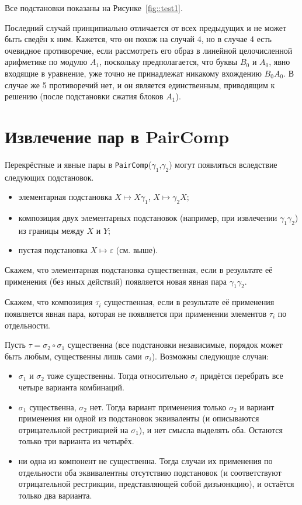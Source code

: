\documentclass[12pt]{article}
\begin{document}
Все подстановки показаны на Рисунке~\ref{fig::test1}.

Последний случай принципиально отличается от всех предыдущих и не может быть сведён к ним. Кажется, что он похож на случай 4, но в случае 4 есть очевидное противоречие, если рассмотреть его образ в линейной целочисленной арифметике по модулю $A_1$, поскольку предполагается, что буквы $B_0$ и $A_0$, явно входящие в уравнение, уже точно не принадлежат никакому вхождению $B_0 A_0$. В случае же 5 противоречий нет, и он является единственным, приводящим к решению (после подстановки сжатия блоков $A_1$). 

\section{Извлечение пар в PairComp}

Перекрёстные и явные пары в \verb|PairComp|($\gamma_1$,$\gamma_2$) могут появляться вследствие следующих подстановок.
\begin{itemize}
\item элементарная подстановка $X\mapsto X\gamma_1$, $X\mapsto \gamma_2 X$;
\item композиция двух элементарных подстановок (например, при извлечении $\gamma_1\gamma_2$) из границы между $X$ и $Y$;
\item пустая подстановка $X\mapsto \varepsilon$ (см. выше).
\end{itemize}
 
Скажем, что элементарная подстановка существенная, если в результате её применения (без иных действий) появляется новая явная пара $\gamma_1\gamma_2$. 
 
Скажем, что композиция $\tau_i$ существенная, если в результате её применения появляется явная пара, которая не появляется при применении элементов $\tau_i$ по отдельности.

Пусть $\tau = \sigma_2 \circ \sigma_1$ существенна (все подстановки независимые, порядок может быть любым, существенны лишь сами $\sigma_i$). Возможны следующие случаи:

\begin{itemize}
\item $\sigma_1$ и $\sigma_2$ тоже существенны. Тогда относительно $\sigma_i$ придётся перебрать все четыре варианта комбинаций.
\item $\sigma_1$ существенна, $\sigma_2$ нет. Тогда вариант применения только $\sigma_2$ и вариант применения ни одной из подстановок эквиваленты (и описываются отрицательной рестрикцией на $\sigma_1$), и нет смысла выделять оба. Остаются только три варианта из четырёх.
\item ни одна из компонент не существенна. Тогда случаи их применения по отдельности оба эквивалентны отсутствию подстановок (и соответствуют отрицательной рестрикции, представляющей собой дизъюнкцию), и остаётся только два варианта.  
\end{itemize}
\end{document}
